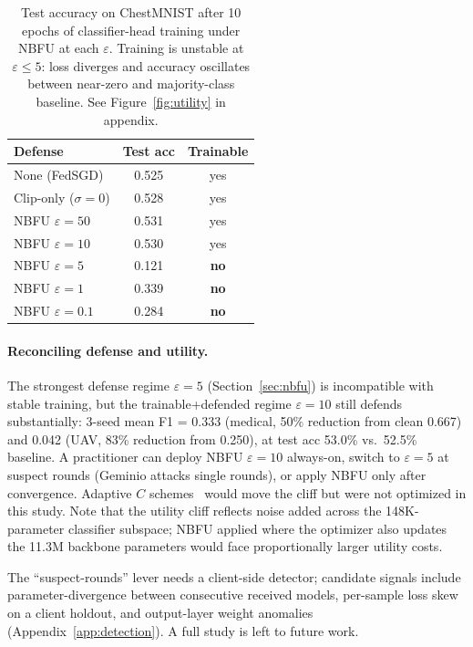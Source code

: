 \documentclass[11pt]{article}
\begin{document}
\begin{table}[h]
\centering
\small
\setlength{\tabcolsep}{4pt}
\begin{tabular}{lcc}
\toprule
Defense & Test acc & Trainable \\
\midrule
None (FedSGD) & 0.525 & yes \\
Clip-only ($\sigma{=}0$) & 0.528 & yes \\
NBFU $\varepsilon{=}50$ & 0.531 & yes \\
NBFU $\varepsilon{=}10$ & 0.530 & yes \\
NBFU $\varepsilon{=}5$  & 0.121 & \textbf{no} \\
NBFU $\varepsilon{=}1$  & 0.339 & \textbf{no} \\
NBFU $\varepsilon{=}0.1$ & 0.284 & \textbf{no} \\
\bottomrule
\end{tabular}
\caption{Test accuracy on ChestMNIST after 10 epochs of classifier-head training under NBFU at each $\varepsilon$. Training is unstable at $\varepsilon \le 5$: loss diverges and accuracy oscillates between near-zero and majority-class baseline. See Figure~\ref{fig:utility} in appendix.}
\label{tab:utility}
\end{table}

\paragraph{Reconciling defense and utility.}
The strongest defense regime $\varepsilon{=}5$ (Section~\ref{sec:nbfu}) is incompatible with stable training, but the trainable+defended regime $\varepsilon{=}10$ still defends substantially: 3-seed mean F1 = 0.333 (medical, 50\% reduction from clean 0.667) and 0.042 (UAV, 83\% reduction from 0.250), at test acc 53.0\% vs.\ 52.5\% baseline. A practitioner can deploy NBFU $\varepsilon{=}10$ always-on, switch to $\varepsilon{=}5$ at suspect rounds (Geminio attacks single rounds), or apply NBFU only after convergence. Adaptive $C$ schemes~\citep{andrew2021adaptive} would move the cliff but were not optimized in this study. Note that the utility cliff reflects noise added across the 148K-parameter classifier subspace; NBFU applied where the optimizer also updates the 11.3M backbone parameters would face proportionally larger utility costs.

The ``suspect-rounds'' lever needs a client-side detector; candidate signals include parameter-divergence between consecutive received models, per-sample loss skew on a client holdout, and output-layer weight anomalies (Appendix~\ref{app:detection}). A full study is left to future work.
\end{document}
